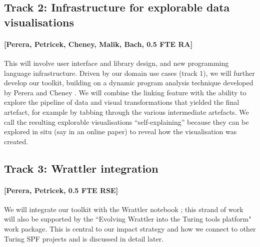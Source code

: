 \subsection*{Track 2: Infrastructure for explorable data visualisations}

\paragraph{[Perera, Petricek, Cheney, Malik, Bach, 0.5 FTE RA]} This will
involve user interface and library design, and new programming language
infrastructure. Driven by our domain use cases (track 1), we will further
develop our toolkit, building on a dynamic program analysis technique developed
by Perera and Cheney \cite{perera12a,ricciotti17}. We will combine the linking
feature with the ability to explore the pipeline of data and visual
transformations that yielded the final artefact, for example by tabbing through
the various intermediate artefacts. We call the resulting explorable
visualisations ``self-explaining'' because they can be explored in situ (say in
an online paper) to reveal how the visualisation was created.

\subsection*{Track 3: Wrattler integration}

\paragraph{[Perera, Petricek, 0.5 FTE RSE]} We will integrate our toolkit with
the Wrattler notebook \cite{petricek18}; this strand of work will also be
supported by the ``Evolving Wrattler into the Turing tools platform" work
package. This is central to our impact strategy and how we connect to other
Turing SPF projects and is discussed in detail later.
